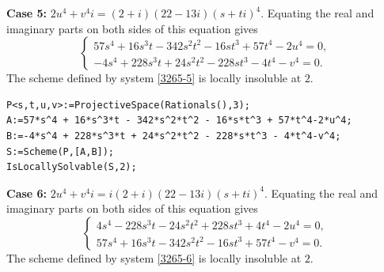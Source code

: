 \documentclass[a4paper,12pt,english,reqno]{amsart}
\begin{document}
{\bf Case 5:} $2u^4+v^4i=(2+i)(22-13i)(s+ti)^4$. Equating the real and imaginary parts on both sides of this equation gives
\begin{equation}\label{3265-5}
\begin{cases}
57s^4 + 16s^3t - 342s^2t^2 - 16st^3 + 57t^4 - 2u^4=0,\\
-4s^4 + 228s^3t + 24s^2t^2 - 228st^3 - 4t^4 - v^4=0.
\end{cases}
\end{equation}
The scheme defined by system \eqref{3265-5} is locally insoluble at $2$.

\begin{lstlisting}
P<s,t,u,v>:=ProjectiveSpace(Rationals(),3);
A:=57*s^4 + 16*s^3*t - 342*s^2*t^2 - 16*s*t^3 + 57*t^4-2*u^4;
B:=-4*s^4 + 228*s^3*t + 24*s^2*t^2 - 228*s*t^3 - 4*t^4-v^4;
S:=Scheme(P,[A,B]);
IsLocallySolvable(S,2);
\end{lstlisting}


{\bf Case 6:} $2u^4+v^4i=i(2+i)(22-13i)(s+ti)^4$. Equating the real and imaginary parts on both sides of this equation gives
\begin{equation}\label{3265-6}
\begin{cases}
4s^4 - 228s^3t - 24s^2t^2 + 228st^3 + 4t^4 - 2u^4=0,\\
57s^4 + 16s^3t - 342s^2t^2 - 16st^3 + 57t^4 - v^4=0.
\end{cases}
\end{equation}
The scheme defined by system \eqref{3265-6} is locally insoluble at $2$.


\end{document}
